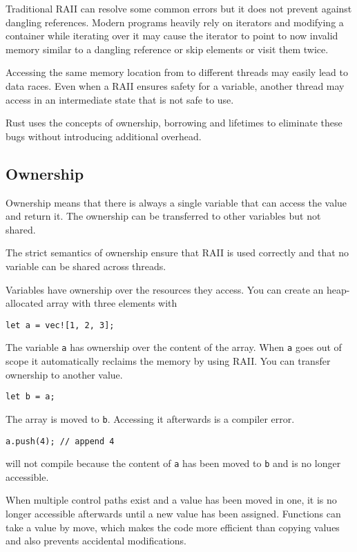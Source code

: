 \documentclass[conference,twocolumn]{IEEEtran}
\begin{document}
Traditional RAII can resolve some common errors but it does not prevent against dangling references. Modern programs heavily rely on iterators and modifying a container while iterating over it may cause the iterator to point to now invalid memory similar to a dangling reference or skip elements or visit them twice.

Accessing the same memory location from to different threads may easily lead to data races. Even when a RAII ensures safety for a variable, another thread may access in an intermediate state that is not safe to use.

Rust uses the concepts of ownership, borrowing and lifetimes to eliminate these bugs without introducing additional overhead.

\subsection{Ownership}

Ownership means that there is always a single variable that can access the value and return it. The ownership can be transferred to other variables but not shared. \cite{RustBook}

The strict semantics of ownership ensure that RAII is used correctly and that no variable can be shared across threads.

Variables have ownership over the resources they access.
You can create an heap-allocated array with three elements with
\begin{lstlisting}
let a = vec![1, 2, 3];
\end{lstlisting}
The variable \verb|a| has ownership over the content of the array. When \verb|a| goes out of scope it automatically reclaims the memory by using RAII.
You can transfer ownership to another value.
\begin{lstlisting}
let b = a;
\end{lstlisting}
The array is moved to \verb|b|. Accessing it afterwards is a compiler error.

\begin{lstlisting}
a.push(4); // append 4
\end{lstlisting}
will not compile because the content of \verb|a| has been moved to \verb|b| and is no longer accessible.

When multiple control paths exist and a value has been moved in one, it is no longer accessible afterwards until a new value has been assigned. Functions can take a value by move, which makes the code more efficient than copying values and also prevents accidental modifications.
\end{document}

